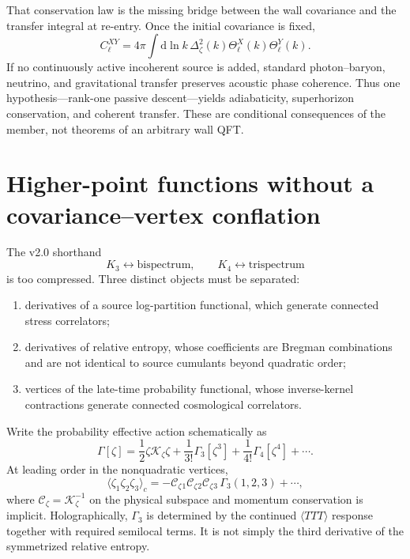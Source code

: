 \documentclass[11pt]{article}
\numberwithin{equation}{section}
\newcommand{\dd}{\mathrm d}
\newcommand{\Kz}{\mathcal K_\zeta}
\newcommand{\Cz}{\mathcal C_\zeta}
\theoremstyle{definition}
\theoremstyle{remark}
\begin{document}
That conservation law is the missing bridge between the wall covariance and the transfer integral at re-entry. Once the initial covariance is fixed,
\begin{equation}
C_\ell^{XY}
=4\pi\int\dd\ln k\,
\Delta_\zeta^2(k)\Theta_\ell^X(k)\Theta_\ell^Y(k).
\end{equation}
If no continuously active incoherent source is added, standard photon--baryon, neutrino, and gravitational transfer preserves acoustic phase coherence. Thus one hypothesis---rank-one passive descent---yields adiabaticity, superhorizon conservation, and coherent transfer. These are conditional consequences of the member, not theorems of an arbitrary wall QFT.

\section{Higher-point functions without a covariance--vertex conflation}
\label{sec:higher}

The v2.0 shorthand
\[
K_3\leftrightarrow\text{bispectrum},
\qquad
K_4\leftrightarrow\text{trispectrum}
\]
is too compressed. Three distinct objects must be separated:
\begin{enumerate}
\item derivatives of a source log-partition functional, which generate connected stress correlators;
\item derivatives of relative entropy, whose coefficients are Bregman combinations and are not identical to source cumulants beyond quadratic order;
\item vertices of the late-time probability functional, whose inverse-kernel contractions generate connected cosmological correlators.
\end{enumerate}

Write the probability effective action schematically as
\begin{equation}
\Gamma[\zeta]
=\frac12\zeta\Kz\zeta
+\frac{1}{3!}\Gamma_3[\zeta^3]
+\frac{1}{4!}\Gamma_4[\zeta^4]+\cdots.
\end{equation}
At leading order in the nonquadratic vertices,
\begin{equation}
\boxed{
\langle\zeta_1\zeta_2\zeta_3\rangle_c
=-\Cz{}_1\Cz{}_2\Cz{}_3\,\Gamma_3(1,2,3)+\cdots,}
\end{equation}
where $\Cz=\Kz^{-1}$ on the physical subspace and momentum conservation is implicit. Holographically, $\Gamma_3$ is determined by the continued $\langle TTT\rangle$ response together with required semilocal terms. It is not simply the third derivative of the symmetrized relative entropy.
\end{document}
